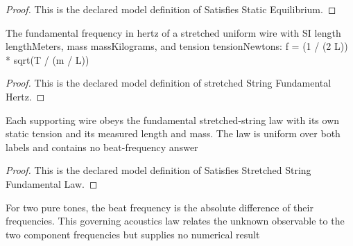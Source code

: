 \begin{proof}
  This is the declared model definition of Satisfies Static Equilibrium.
\end{proof}
\begin{definition}
  \label{def:physics:phyx-mini-0172:phyxminiproblems-problemphyxmini0172-stretchedstringfundamentalhertz}
  The fundamental frequency in hertz of a stretched uniform wire with SI length lengthMeters, mass massKilograms, and tension tensionNewtons: f = (1 / (2 L)) * sqrt(T / (m / L))
\end{definition}
\begin{proof}
  This is the declared model definition of stretched String Fundamental Hertz.
\end{proof}
\begin{definition}
  \label{def:physics:phyx-mini-0172:phyxminiproblems-problemphyxmini0172-satisfiesstretchedstringfundamentallaw}
  Each supporting wire obeys the fundamental stretched-string law with its own static tension and its measured length and mass. The law is uniform over both labels and contains no beat-frequency answer
\end{definition}
\begin{proof}
  This is the declared model definition of Satisfies Stretched String Fundamental Law.
\end{proof}
\begin{definition}
  \label{def:physics:phyx-mini-0172:phyxminiproblems-problemphyxmini0172-satisfiesbeatfrequencylaw}
  For two pure tones, the beat frequency is the absolute difference of their frequencies. This governing acoustics law relates the unknown observable to the two component frequencies but supplies no numerical result
\end{definition}
